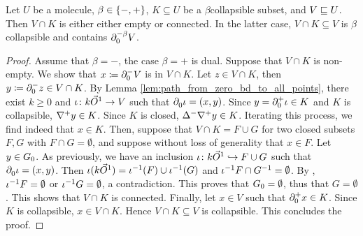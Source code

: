 \begin{lem} \label{lem:collapsible_connected_with_all_closure_element}
    Let \( U \) be a molecule, \( \beta \in \set{-, +} \), \( K \subseteq U \) be a \( \beta \)\nbd collapsible subset, and \( V \submol U \).
    Then \( V \cap K \) is either either empty or connected.
    In the latter case, \( V \cap K \subseteq V \) is \( \beta \)\nbd collapsible and contains \( \bd{0}{-\beta} V \).
\end{lem}
\begin{proof}
    Assume that \( \beta = - \), the case \( \beta = + \) is dual.
    Suppose that \( V \cap K \) is non-empty.
    We show that \( x \eqdef \bd{0}{-} V \) is in \( V \cap K \).
    Let \( z \in V \cap K \), then \( y \eqdef \bd{0}{-} z \in V \cap K \).
    By Lemma \ref{lem:path_from_zero_bd_to_all_points}, there exist \( k \geq 0 \) and \( \iota \colon k\arr \to V \) such that \( \bd{0}{} \iota = (x, y) \).
    Since \( y = \bd{0}{+} \iota \in K \) and \( K \) is collapsible, \( \cofaces{}{+} y \in K \).
    Since \( K \) is closed, \( \faces{}{-} \cofaces{}{+} y \in K \).
    Iterating this process, we find indeed that \( x \in K \).
    Then, suppose that \( V \cap K = F \cup G \) for two closed subsets \( F, G \) with \( F \cap G = \emptyset \), and suppose without loss of generality that \( x \in F \).
    Let \( y \in \gr{0}{G} \). 
    As previously, we have an inclusion \( \iota \colon k\arr \incl F \cup G \) such that \( \bd{0}{}\iota = (x, y) \).
    Then \( \iota(k\arr) = \invrs{\iota}(F) \cup \invrs{\iota}(G) \) and \( \invrs{\iota}F \cap \invrs{G} = \emptyset \).
    By \cite[Lemma 3.3.13]{hadzihasanovic2024combinatorics}, \( \invrs{\iota}F = \emptyset \) or \( \invrs{\iota}G = \emptyset \), a contradiction.
    This proves that \(  \gr{0}{G} = \emptyset \), thus that \( G = \emptyset \).
    This shows that \( V \cap K \) is connected.
    Finally, let \( x \in V \) such that \( \bd{0}{+} x \in K \).
    Since \( K \) is collapsible, \( x \in V \cap K \).
    Hence \( V \cap K \subseteq V \) is collapsible.
    This concludes the proof.
\end{proof}

